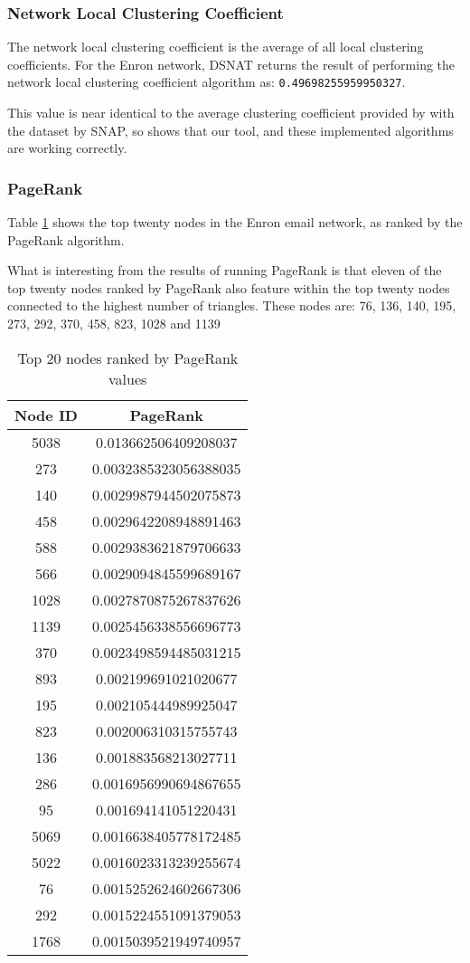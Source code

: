 \subsubsection{Network Local Clustering Coefficient}
The network local clustering coefficient is the average of all local clustering coefficients. For the Enron network, DSNAT returns the result of performing the network local clustering coefficient algorithm as: {\tt 0.49698255959950327}.

This value is near identical to the average clustering coefficient provided by with the dataset by SNAP, so shows that our tool, and these implemented algorithms are working correctly.

\subsubsection{PageRank}
Table \ref{tab:enronpagerank} shows the top twenty nodes in the Enron email network, as ranked by the PageRank algorithm.

What is interesting from the results of running PageRank is that eleven of the top twenty nodes ranked by PageRank also feature within the top twenty nodes connected to the highest number of triangles. These nodes are: 76, 136, 140, 195, 273, 292, 370, 458, 823, 1028 and 1139

\begin{table}%
\centering
\begin{tabular}{|c|c|}
\hline
Node ID & PageRank \\
\hline
5038 & 0.013662506409208037 \\
273 & 0.0032385323056388035 \\
140 & 0.0029987944502075873 \\
458 & 0.0029642208948891463 \\
588 & 0.0029383621879706633 \\
566 & 0.0029094845599689167 \\
1028 & 0.0027870875267837626 \\
1139 & 0.0025456338556696773 \\
370 & 0.0023498594485031215 \\
893 & 0.002199691021020677 \\
195 & 0.002105444989925047 \\
823 & 0.002006310315755743 \\
136 & 0.001883568213027711 \\
286 & 0.0016956990694867655 \\
95 & 0.001694141051220431 \\
5069 & 0.0016638405778172485 \\
5022 & 0.0016023313239255674 \\
76 & 0.0015252624602667306 \\
292 & 0.0015224551091379053 \\
1768 & 0.0015039521949740957 \\
\hline
\end{tabular}
\caption{Top 20 nodes ranked by PageRank values}
\label{tab:enronpagerank}
\end{table}


